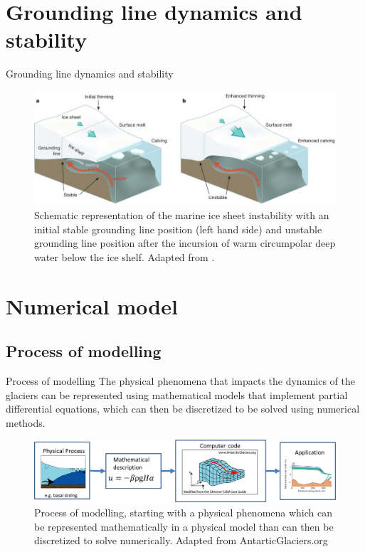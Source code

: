 \documentclass[11pt]{beamer}
\begin{document}
	\section{Grounding line dynamics and stability}
		\begin{frame}{Grounding line dynamics and stability}
		\begin{figure}
			\centering
			\includegraphics[scale=0.3]{../fig/Grounding_line.png}
			\caption{Schematic representation of the marine ice sheet instability with an initial stable grounding line position (left hand side) and unstable grounding line position after the incursion of warm circumpolar deep water below the ice shelf. Adapted from \cite{hanna2013white}.}
			\label{grounding_line_instability}
		\end{figure}
		\end{frame}

	\section{Numerical model}
	\subsection{Process of modelling}
	\begin{frame}{Process of modelling}
		\justifying
		The physical phenomena that impacts the dynamics of the glaciers can be represented using mathematical models that implement partial differential equations, which can then be discretized to be solved using numerical methods.
		\begin{figure}
			\centering
			\includegraphics[scale=0.4]{../fig/Numerical_modelling_scheme.png}
			\caption{Process of modelling, starting with a physical phenomena which can be represented mathematically in a physical model than can then be discretized to solve numerically. Adapted from AntarticGlaciers.org}
			\label{Modelling}
		\end{figure}
	\end{frame}
\end{document}
